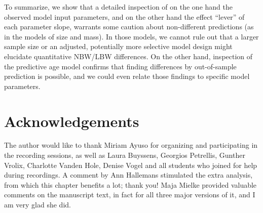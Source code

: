 \begin{change}
To summarize, we show that a detailed inspection of on the one hand the observed model input parameters, and on the other hand the effect ``lever'' of each parameter slope, warrants some caution about non-different predictions (as in the models of size and mass).
In those models, we cannot rule out that a larger sample size or an adjusted, potentially more selective model design might elucidate quantitative NBW/LBW differences.
On the other hand, inspection of the predictive age model confirms that finding differences by out-of-sample prediction is possible, and we could even relate those findings to specific model parameters.

\end{change}






\FloatBarrier
\clearpage
\section{Acknowledgements}
\label{sec:org2d8bfbc}
The author would like to thank Miriam Ayuso for organizing and participating in the recording sessions, as well as Laura Buyssens, Georgios Petrellis, Gunther Vrolix, Charlotte Vanden Hole, Denise Vogel and all students who joined for help during recordings.
A comment by Ann Hallemans stimulated the extra analysis, from which this chapter benefits a lot; thank you!
Maja Mielke provided valuable comments on the manuscript text, in fact for all three major versions of it, and I am very glad she did.


\FloatBarrier
\clearpage
% 
% 
